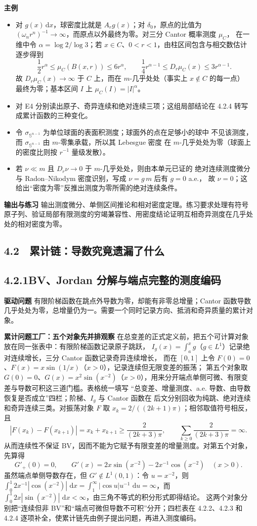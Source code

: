 \documentclass[11pt,a4paper]{ctexart}
\newcommand{\dd}{\,\mathrm d}
\newcommand{\planitem}[1]{\par\smallskip\noindent\textcolor{deepblue}{\textbf{#1}}\quad}
\newcommand{\unithead}[2]{\subsection{#1\quad #2}}
\begin{document}
\planitem{主例}
\begin{itemize}
\item 对 $g(x)\dd x$，球密度比就是 $A_rg(x)$；对 $\delta_0$，原点的比值为
$(\omega_nr^n)^{-1}\to\infty$，而原点以外最终为零。对三分 Cantor 概率测度 $\mu_C$，
在一维中令 $\alpha=\log2/\log3$；若 $x\in C$、$0<r<1$，由柱区间包含与相交数估计逐步得到
\[
\frac12r^\alpha\le\mu_C(B(x,r))\le6r^\alpha,\qquad
\frac14r^{\alpha-1}\le D_r\mu_C(x)\le3r^{\alpha-1}.
\]
故 $D_r\mu_C(x)\to\infty$ 于 $C$ 上，而在 $m$-几乎处处（事实上 $x\notin C$ 的每一点）
最终为零；基本区间 $I$ 上 $\mu_C(I)=|I|^\alpha$。
\item 对 E4 分别读出原子、奇异连续和绝对连续三项；这组局部结论在 4.2.4 转写成累计函数的三种变化。
\item 令 $\sigma_{\mathbb S^{n-1}}$ 为单位球面的表面积测度；球面外的点在足够小的球中
不见该测度，而 $\sigma_{\mathbb S^{n-1}}$ 由 $m$-零集承载，所以其 Lebesgue 密度
在 $m$-几乎处处为零（球面上的密度比则按 $r^{-1}$ 量级发散）。
\item 若 $\nu\ll m$ 且 $D_r\nu\to0$ 于 $m$-几乎处处，则由本单元已证的
绝对连续测度微分与 Radon--Nikodym 密度识别，写成 $\nu=g\,m$ 后有 $g=0$ a.e.，
故 $\nu=0$；这给出“密度为零”反推出测度为零所需的绝对连续条件。
\end{itemize}

\planitem{输出与练习}
输出测度微分、单侧区间推论和相对密度定理。练习要求处理有符号原子列、验证局部有限测度的穷竭兼容性、用密度结论证明互相奇异测度在几乎处处的相对密度为零。

\subsection*{4.2　累计链：导数究竟遗漏了什么}

\unithead{4.2.1}{BV、Jordan 分解与端点完整的测度编码}

\planitem{驱动问题}
有限阶梯函数在跳点外导数为零，却能有非零总增量；Cantor 函数导数几乎处处为零，总增量仍为一。需要一个同时记录方向、抵消和奇异质量的累计对象。

\planitem{累计问题工厂：五个对象先并排观察}
在总变差的正式定义前，把五个可计算对象放在同一张表中：有限阶梯函数记录原子跳跃，
$I_g(x)=\int_a^xg$（$g\in L^1$）记录绝对连续增长，三分 Cantor 函数记录奇异连续增长，
而在 $[0,1]$ 上令 $F(0)=0$、$F(x)=x\sin(1/x)$（$x>0$），记录连续但无限变差的振荡；
第五个对象取 $G(0)=0$、$G(x)=x^2\sin(x^{-2})$（$x>0$），用来分开端点单侧可微、有限变差与导数可积这三道门槛。表格统一填写
“总变差、增量测度、a.e. 导数、由导数恢复是否成立”四栏；阶梯、$I_g$ 与 Cantor 函数在
后文分别回收为纯跳、绝对连续和奇异连续三类。对振荡对象 $F$ 取
$x_k=2/((2k+1)\pi)$；相邻取值符号相反，且
\[
 |F(x_k)-F(x_{k+1})|=x_k+x_{k+1}
 \ge\frac{2}{(2k+3)\pi},
 \qquad\sum_{k\ge0}\frac{2}{(2k+3)\pi}=\infty.
\]
从而连续性不保证 BV，因而不能为它赋予有限变差的增量测度。对第五个对象，先算得
\[
 G'_+(0)=0,\qquad
 G'(x)=2x\sin(x^{-2})-2x^{-1}\cos(x^{-2})\quad(x>0).
\]
虽然端点单侧导数存在，但 $G'\notin L^1(0,1)$：令 $u=x^{-2}$，则
$\int_0^1 2x^{-1}|\cos(x^{-2})|\,\dd x
=\int_1^\infty |\cos u|u^{-1}\,\dd u=\infty$，而
$\int_0^1 2x|\sin(x^{-2})|\,\dd x<\infty$，由三角不等式的积分形式即得结论。
这两个对象分别把“连续但非 BV”和“端点可微但导数不可积”分开；四栏表在
4.2.2、4.2.3 和 4.2.4 逐项补全，使累计链先由例子提出问题，再进入测度编码。
\end{document}
